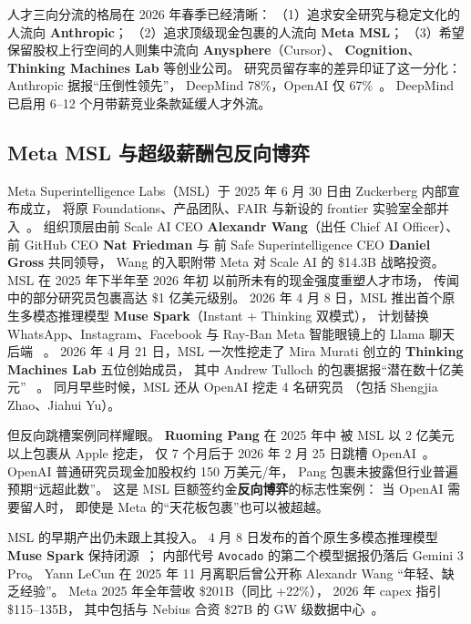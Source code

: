 人才三向分流的格局在 2026 年春季已经清晰：
（1）追求安全研究与稳定文化的人流向 \textbf{Anthropic}；
（2）追求顶级现金包裹的人流向 \textbf{Meta MSL}；
（3）希望保留股权上行空间的人则集中流向 \textbf{Anysphere}（Cursor）、
\textbf{Cognition}、\textbf{Thinking Machines Lab} 等创业公司。
研究员留存率的差异印证了这一分化：
Anthropic 据报“压倒性领先”，
DeepMind 78\%，OpenAI 仅 67\%~\cite{brin_claude_taskforce_2026}。
DeepMind 已启用 6--12 个月带薪竞业条款延缓人才外流。

\subsection{Meta MSL 与超级薪酬包反向博弈}

Meta Superintelligence Labs（MSL）于 2025 年 6 月 30 日由 Zuckerberg 内部宣布成立，
将原 Foundations、产品团队、FAIR 与新设的 frontier 实验室全部并入~\cite{meta_msl_founding_2025}。
组织顶层由前 Scale AI CEO \textbf{Alexandr Wang}（出任 Chief AI Officer）、
前 GitHub CEO \textbf{Nat Friedman} 与
前 Safe Superintelligence CEO \textbf{Daniel Gross} 共同领导，
Wang 的入职附带 Meta 对 Scale AI 的 \$14.3B 战略投资。
MSL 在 2025 年下半年至 2026 年初
以前所未有的现金强度重塑人才市场，
传闻中的部分研究员包裹高达 \$1 亿美元级别。
2026 年 4 月 8 日，MSL 推出首个原生多模态推理模型
\textbf{Muse Spark}（Instant + Thinking 双模式），
计划替换 WhatsApp、Instagram、Facebook 与 Ray-Ban Meta 智能眼镜上的 Llama 聊天后端%
~\cite{wang_msl_muse_spark_2026}。
2026 年 4 月 21 日，MSL 一次性挖走了
Mira Murati 创立的 \textbf{Thinking Machines Lab} 五位创始成员，
其中 Andrew Tulloch 的包裹据报“潜在数十亿美元”%
~\cite{meta_msl_thinking_machines_2026}。
同月早些时候，MSL 还从 OpenAI 挖走 4 名研究员
（包括 Shengjia Zhao、Jiahui Yu）。

但反向跳槽案例同样耀眼。
\textbf{Ruoming Pang} 在 2025 年中
被 MSL 以 2 亿美元以上包裹从 Apple 挖走，
仅 7 个月后于 2026 年 2 月 25 日跳槽 OpenAI~\cite{pang_meta_to_openai_2026}。
OpenAI 普通研究员现金加股权约 150 万美元/年，
Pang 包裹未披露但行业普遍预期“远超此数”。
这是 MSL 巨额签约金\textbf{反向博弈}的标志性案例：
当 OpenAI 需要留人时，
即使是 Meta 的“天花板包裹”也可以被超越。

MSL 的早期产出仍未跟上其投入。
4 月 8 日发布的首个原生多模态推理模型 \textbf{Muse Spark}
保持闭源~\cite{wang_msl_muse_spark_2026}；
内部代号 \texttt{Avocado} 的第二个模型据报仍落后 Gemini 3 Pro。
Yann LeCun 在 2025 年 11 月离职后曾公开称 Alexandr Wang “年轻、缺乏经验”。
Meta 2025 年全年营收 \$201B（同比 +22\%），
2026 年 capex 指引 \$115--135B，
其中包括与 Nebius 合资 \$27B 的 GW 级数据中心~\cite{meta_nebius_jv_2026}。


